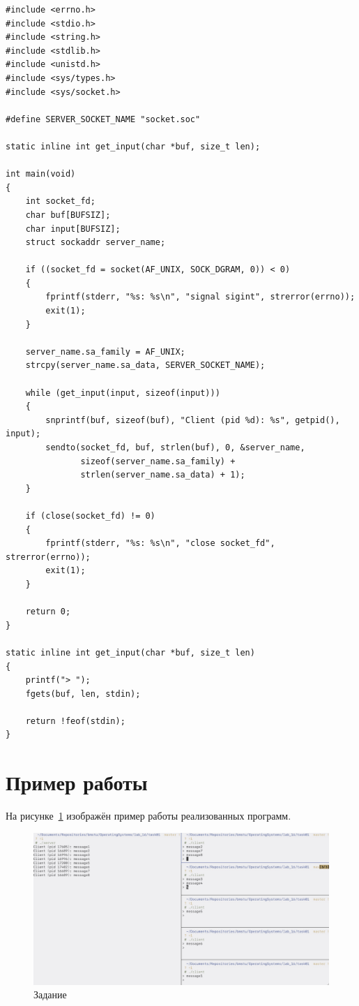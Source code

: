 \begin{lstlisting}[caption={Текст программы-клиента},label=lst:fclient]
#include <errno.h>
#include <stdio.h>
#include <string.h>
#include <stdlib.h>
#include <unistd.h>
#include <sys/types.h>
#include <sys/socket.h>

#define SERVER_SOCKET_NAME "socket.soc"

static inline int get_input(char *buf, size_t len);

int main(void)
{
    int socket_fd;
    char buf[BUFSIZ];
    char input[BUFSIZ];
    struct sockaddr server_name;

    if ((socket_fd = socket(AF_UNIX, SOCK_DGRAM, 0)) < 0)
    {
        fprintf(stderr, "%s: %s\n", "signal sigint", strerror(errno));
        exit(1);
    }

    server_name.sa_family = AF_UNIX;
    strcpy(server_name.sa_data, SERVER_SOCKET_NAME);

    while (get_input(input, sizeof(input)))
    {
        snprintf(buf, sizeof(buf), "Client (pid %d): %s", getpid(), input);
        sendto(socket_fd, buf, strlen(buf), 0, &server_name,
               sizeof(server_name.sa_family) +
               strlen(server_name.sa_data) + 1);
    }

    if (close(socket_fd) != 0)
    {
        fprintf(stderr, "%s: %s\n", "close socket_fd", strerror(errno));
        exit(1);
    }

    return 0;
}

static inline int get_input(char *buf, size_t len)
{
    printf("> ");
    fgets(buf, len, stdin);

    return !feof(stdin);
}
\end{lstlisting}

\section{Пример работы}

На рисунке~\ref{img:task01} изображён пример работы реализованных программ.

\begin{figure}[H]
    \centering
    \includegraphics[scale=0.235]{images/task01.png}
    \caption{Задание }\label{img:task01}
\end{figure}

